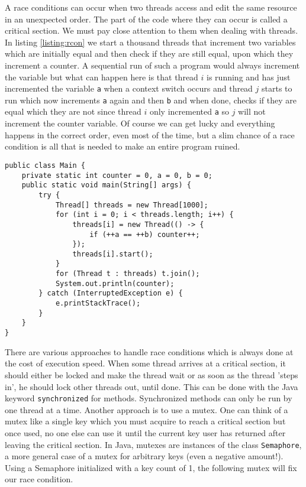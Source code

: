 A race conditions can occur when two threads access and edit the same resource in an unexpected order. The part of the code where they can occur is called a critical section. We must pay close attention to them when dealing with threads. In listing \ref{listing:rcon} we start a thousand threads that increment two variables which are initially equal and then check if they are still equal, upon which they increment a counter. A sequential run of such a program would always increment the variable but what can happen here is that thread $i$ is running and has just incremented the variable \texttt{a} when a context switch occurs and thread $j$ starts to run which now increments \texttt{a} again and then \texttt{b} and when done, checks if they are equal which they are not since thread $i$ only incremented \texttt{a} so $j$ will not increment the counter variable. Of course we can get lucky and everything happens in the correct order, even most of the time, but a slim chance of a race condition is all that is needed to make an entire program ruined.  

\begin{lstlisting}[style=A_Java, caption={Race condition}, label={listing:rcon}]
public class Main {
    private static int counter = 0, a = 0, b = 0;
    public static void main(String[] args) {
        try {
            Thread[] threads = new Thread[1000];
            for (int i = 0; i < threads.length; i++) {
                threads[i] = new Thread(() -> {
                    if (++a == ++b) counter++;
                });
                threads[i].start();
            }
            for (Thread t : threads) t.join();
            System.out.println(counter);
        } catch (InterruptedException e) {
            e.printStackTrace();
        }
    }
}
\end{lstlisting}

There are various approaches to handle race conditions which is always done at the cost of execution speed. When some thread arrives at a critical section, it should either be locked and make the thread wait or as soon as the thread 'steps in', he should lock other threads out, until done. This can be done with the Java keyword \verb!synchronized! for methods. Synchronized methods can only be run by one thread at a time. Another approach is to use a mutex. One can think of a mutex like a single key which you must acquire to reach a critical section but once used, no one else can use it until the current key user has returned after leaving the critical section. In Java, mutexes are instances of the class \texttt{Semaphore}, a more general case of a mutex for arbitrary keys (even a negative amount!). Using a Semaphore initialized with a key count of 1, the following mutex will fix our race condition.

